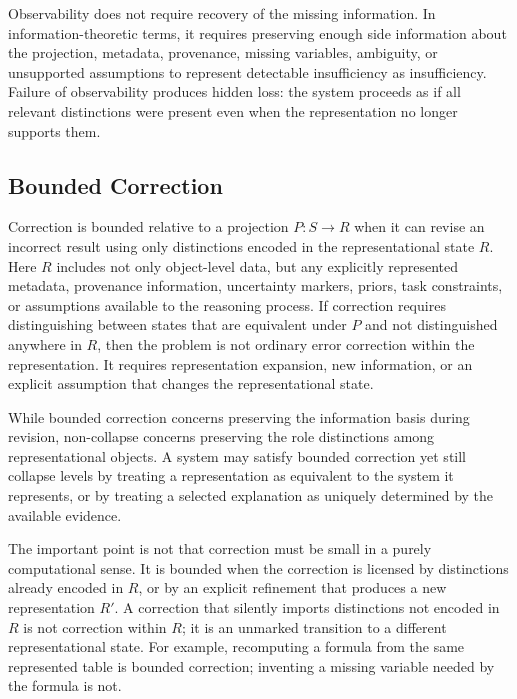 \documentclass[11pt]{article}
\begin{document}
Observability does not require recovery of the missing information. In information-theoretic terms, it requires preserving enough side information about the projection, metadata, provenance, missing variables, ambiguity, or unsupported assumptions to represent detectable insufficiency as insufficiency. Failure of observability produces hidden loss: the system proceeds as if all relevant distinctions were present even when the representation no longer supports them.

\subsection{Bounded Correction}

Correction is bounded relative to a projection $P:S\rightarrow R$ when it can revise an incorrect result using only distinctions encoded in the representational state $R$. Here $R$ includes not only object-level data, but any explicitly represented metadata, provenance information, uncertainty markers, priors, task constraints, or assumptions available to the reasoning process. If correction requires distinguishing between states that are equivalent under $P$ and not distinguished anywhere in $R$, then the problem is not ordinary error correction within the representation. It requires representation expansion, new information, or an explicit assumption that changes the representational state.

While bounded correction concerns preserving the information basis during revision, non-collapse concerns preserving the role distinctions among representational objects. A system may satisfy bounded correction yet still collapse levels by treating a representation as equivalent to the system it represents, or by treating a selected explanation as uniquely determined by the available evidence.

The important point is not that correction must be small in a purely computational sense. It is bounded when the correction is licensed by distinctions already encoded in $R$, or by an explicit refinement that produces a new representation $R'$. A correction that silently imports distinctions not encoded in $R$ is not correction within $R$; it is an unmarked transition to a different representational state. For example, recomputing a formula from the same represented table is bounded correction; inventing a missing variable needed by the formula is not.
\end{document}
